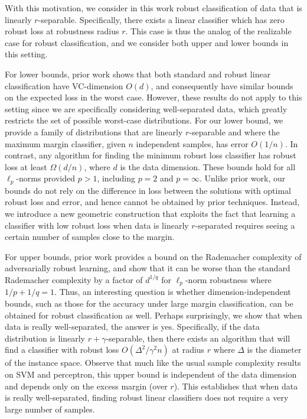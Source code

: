 With this motivation, we consider in this work robust classification of data that is linearly $r$-separable. Specifically, there exists a linear classifier which has zero robust loss at robustness radius $r$. This case is thus the analog of the realizable case for robust classification, and we consider both upper and lower bounds in this setting.

For lower bounds, prior work \cite{Cullina18} shows that both standard and robust linear classification have VC-dimension $O(d)$, and consequently have similar bounds on the expected loss in the worst case. However, these results do not apply to this setting since we are specifically considering well-separated data, which greatly restricts the set of possible worst-case distributions.  For our lower bound, we provide a family of distributions that are linearly $r$-separable and where the maximum margin classifier, given $n$ independent samples, has error $O(1/n)$. In contrast, any algorithm for finding the minimum robust loss classifier has robust loss at least $\Omega(d/n)$, where $d$ is the data dimension. These bounds hold for all $\ell_p$-norms provided $p > 1$, including $p=2$ and $p=\infty$. Unlike prior work, our bounds do not rely on the difference in loss between the solutions with optimal robust loss and error, and hence cannot be obtained by prior techniques. Instead, we introduce a new geometric construction that exploits the fact that learning a classifier with low robust loss when data is linearly $r$-separated requires seeing a certain number of samples close to the margin.

For upper bounds, prior work \cite{bartlett19} provides a bound on the Rademacher complexity of adversarially robust learning, and show that it can be worse than the standard Rademacher complexity by a factor of $d^{1/q}$ for $\ell_p$-norm robustness where $1/p + 1/q = 1$. Thus, an interesting question is whether dimension-independent bounds, such as those for the accuracy under large margin classification, can be obtained for robust classification as well. Perhaps surprisingly, we show that when data is really well-separated, the answer is yes. Specifically, if the data distribution is linearly $r + \gamma$-separable, then there exists an algorithm that will find a classifier with robust loss $O(\Delta^2/\gamma^2 n)$ at radius $r$ where $\Delta$ is the diameter of the instance space. Observe that much like the usual sample complexity results on SVM and perceptron, this upper bound is independent of the data dimension and depends only on the excess margin (over $r$). This establishes that when data is really well-separated, finding robust linear classifiers does not require a very large number of samples. 

